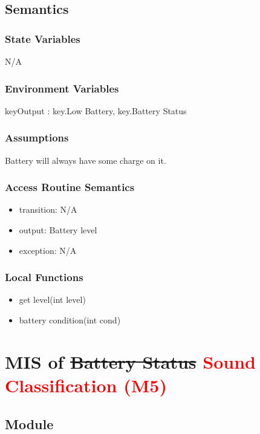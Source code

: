 \documentclass[12pt, titlepage]{article}
\begin{document}
\subsection{Semantics}

\subsubsection{State Variables}

N/A

\subsubsection{Environment Variables}

keyOutput : {key.Low Battery, key.Battery Status}

\subsubsection{Assumptions}

Battery will always have some charge on it.

\subsubsection{Access Routine Semantics}

\noindent
\begin{itemize}
\item transition: N/A 
\item output: Battery level
\item exception: N/A
\end{itemize}

\subsubsection{Local Functions}
\begin{itemize}
\item get level(int level)
\item battery condition(int cond)
\end{itemize}

\newpage 


\section{MIS of \sout{Battery Status} \textcolor{red}{Sound Classification (M5)}} \label{Module}

\subsection{Module}
\end{document}
